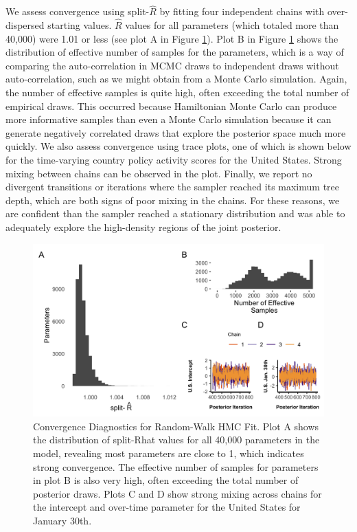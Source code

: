 \documentclass[]{article}
\begin{document}
We assess convergence using split-\(\hat{R}\) by fitting four independent chains with over-dispersed starting values. \(\hat{R}\) values for all parameters (which totaled more than 40,000) were 1.01 or less (see plot A in Figure \ref{fig:modelconv}). Plot B in Figure \ref{fig:modelconv} shows the distribution of effective number of samples for the parameters, which is a way of comparing the auto-correlation in MCMC draws to independent draws without auto-correlation, such as we might obtain from a Monte Carlo simulation. Again, the number of effective samples is quite high, often exceeding the total number of empirical draws. This occurred because Hamiltonian Monte Carlo can produce more informative samples than even a Monte Carlo simulation because it can generate negatively correlated draws that explore the posterior space much more quickly. We also assess convergence using trace plots, one of which is shown below for the time-varying country policy activity scores for the United States. Strong mixing between chains can be observed in the plot. Finally, we report no divergent transitions or iterations where the sampler reached its maximum tree depth, which are both signs of poor mixing in the chains. For these reasons, we are confident than the sampler reached a stationary distribution and was able to adequately explore the high-density regions of the joint posterior.

\begin{figure}
\includegraphics[width=6.46in]{mcmc_evaluate} \caption{Convergence Diagnostics for Random-Walk HMC Fit. Plot A shows the distribution of split-Rhat values for all 40,000 parameters in the model, revealing most parameters are close to 1, which indicates strong convergence. The effective number of samples for parameters in plot B is also very high, often exceeding the total number of posterior draws. Plots C and D show strong mixing across chains for the intercept and over-time parameter for the United States for January 30th.}\label{fig:modelconv}
\end{figure}
\end{document}
